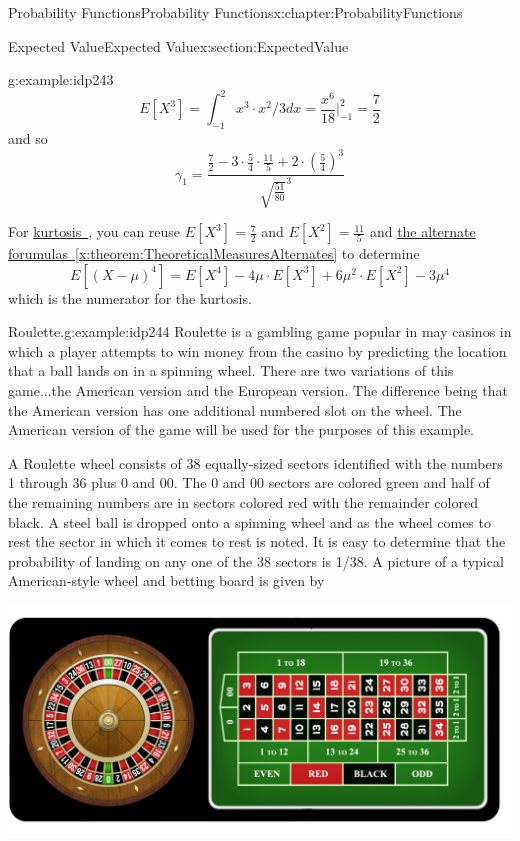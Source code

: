 \documentclass[oneside,10pt,]{book}
\newcommand{\xreffont}{\relax}
\numberwithin{equation}{section}
\begin{document}
\begin{chapterptx}{Probability Functions}{}{Probability Functions}{}{}{x:chapter:ProbabilityFunctions}
\begin{sectionptx}{Expected Value}{}{Expected Value}{}{}{x:section:ExpectedValue}
\begin{example}{}{g:example:idp243}
\begin{equation*}
E[X^3] = \int_{-1}^2 x^3 \cdot x^2/3 dx = \frac{x^6}{18} |_{-1}^2 = \frac{7}{2}
\end{equation*}
and so%
\begin{equation*}
\gamma_1 = \frac{\frac{7}{2} - 3 \cdot \frac{5}{4} \cdot \frac{11}{5} + 2 \cdot (\frac{5}{4})^3}{\sqrt{\frac{51}{80}}^3}
\end{equation*}
%
\par
For \hyperlink{x:li:TheoreticalKurtosis}{kurtosis~{\xreffont 4}}, you can reuse \(E[X^3] = \frac{7}{2}\) and \(E[X^2] = \frac{11}{5}\) and \hyperref[x:theorem:TheoreticalMeasuresAlternates]{the alternate forumulas~{\xreffont\ref{x:theorem:TheoreticalMeasuresAlternates}}} to determine%
\begin{equation*}
E[(X-\mu)^4] = E[X^4] - 4 \mu \cdot E[X^3] + 6 \mu^2 \cdot E[X^2] - 3 \mu^4
\end{equation*}
which is the numerator for the kurtosis.%
\end{example}
%
\par
\begin{example}{Roulette.}{g:example:idp244}%
Roulette is a gambling game popular in may casinos in which a player attempts to win money from the casino by predicting the location that a ball lands on in a spinning wheel.  There are two variations of this game...the American version and the European version. The difference being that the American version has one additional numbered slot on the wheel. The American version of the game will be used for the purposes of this example.%
\par
A Roulette wheel consists of 38 equally-sized sectors identified with the numbers 1 through 36 plus 0 and 00. The 0 and 00 sectors are colored green and half of the remaining numbers are in sectors colored red with the remainder colored black.  A steel ball is dropped onto a spinning wheel and as the wheel comes to rest the sector in which it comes to rest is noted.  It is easy to determine that the probability of landing on any one of the 38 sectors is 1\slash{}38. A picture of a typical American-style wheel and betting board is given by \begin{image}{0}{1}{0}%
\includegraphics[width=\linewidth]{images/6-1-American-Roulette-1024x463.png}

\end{image}
\end{example}
\end{sectionptx}
\end{chapterptx}
\end{document}
